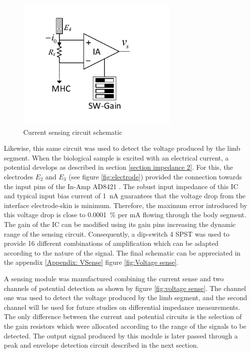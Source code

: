 \begin{figure}[!htpb]
	\centering
	\includegraphics[width=8cm,keepaspectratio]{figure4}
	\caption{Current sensing circuit schematic}
	\label{fig:peak}
\end{figure}

Likewise, this same circuit was used to detect the voltage produced by the limb segment. When the biological sample is excited with an electrical current, a potential develops as described in section \ref{section impedance 2}. For this, the electrodes $E_2$ and $E_3$ (see figure \ref{fig:electrode}) provided the connection towards the input pins of the In-Amp AD8421 \cite{ad:AD8421}. The robust input impedance of this IC and typical input bias current of \SI{1}{\nA} guarantees that the voltage drop from the interface electrode-skin is minimum. Therefore, the maximum error introduced by this voltage drop is close to \SI{0.0001}{\percent} per mA flowing through the body segment. The gain of the IC can be modified using its gain pins increasing the dynamic range of the sensing circuit. Consequently, a dip-switch 4 SPST was used to provide 16 different combinations of amplification which can be adapted according to the nature of the signal. The final schematic can be appreciated in the appendix \ref{Appendix: VSense} figure \ref{fig:Voltage sense}.

A sensing module was manufactured combining the current sense and two channels of potential detection as shown by figure \ref{fig:voltage sense}. The channel one was used to detect the voltage produced by the limb segment, and the second channel will be used for future studies on differential impedance measurements. The only difference between the current and potential circuits is the selection of the gain resistors which were allocated according to the range of the signals to be detected. The output signal produced by this module is later passed through a peak and envelope detection circuit described in the next section. 

